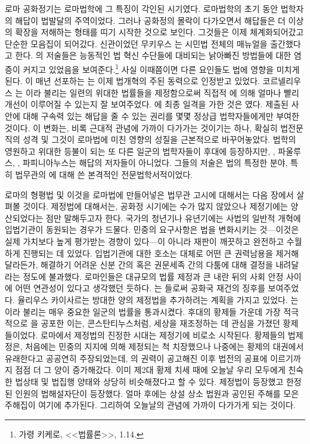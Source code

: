로마 공화정기는 로마법학에 그 특징이 각인된 시기였다.
로마법학의 초기 동안 법학자의 해답이 법발달의 주역이었다.
그러나 공화정의 몰락이 다가오면서 해답들은 더 이상의 확장을 저해하는
형태를 띠기 시작한 것으로 보인다.
그것들은 이제 체계화되어갔고 단순한 모음집이 되어갔다.
신관이었던
무키우스 는
시민법 전체의 매뉴얼을 출간했다고 한다.
의 저술들은
능동적인 법 혁신 수단들에 대비되는 낡아빠진 방법들에 대한 염증이
커지고 있었음을 보여준다.\footnote{%
  가령 키케로, <<법률론>>, 1.14. }
사실 이때쯤이면 다른 요인들도 법에 영향을 미치게 된다.
이 매년 선포하는 는
이제 법개혁의 주된 동력으로 인정받고 있었다.
코르넬리우스 는
이라 불리는 일련의 위대한 법률들을
제정함으로써 직접적 에 의해 얼마나 빨리 개선이 이루어질 수 있는지
잘 보여주었다.
에 최종 일격을 가한 것은 였다.
제출된 사안에 대해 구속력 있는 해답을 줄 수 있는 권리를
몇몇 정상급 법학자들에게만 부여한 것이다.
이 변화는, 비록 근대적 관념에 가까이 다가가는 것이기는 하나,
확실히 법전문직의 성격 및 그것이 로마법에 미친 영향의 성질을
근본적으로 바꾸어놓았다.
법학의 영원하고 위대한 등불이 되는
또 다른 일군의 법학자들이 후대에 등장하지만,
, 파울루스, , 파피니아누스는 해답의 저자들이 아니었다.
그들의 저술은 법의 특정한 분야, 특히 법무관의 에 대해 쓴
본격적인 전문법학서적이었다.

로마의 형평법 및 이것을 로마법에 만들어넣은 법무관 고시에 대해서는
다음 장에서 살펴볼 것이다.
제정법에 대해서는, 공화정 시기에는 수가 많지 않았으나
제정기에는 양산되었다는 점만 말해두고자 한다.
국가의 청년기나 유년기에는 사법의 일반적 개혁에
입법기관이 동원되는 경우가 드물다.
민중의 요구사항은 법을 변화시키는
것---이것은 실제 가치보다 높게 평가받는 경향이 있다---이 아니라
재판이 깨끗하고 완전하고 수월하게 진행되는 데 있었다.
입법기관에 대한 호소는 대체로 어떤 큰 권력남용을 제거해달라든가,
해결하기 어려운 신분 간의 혹은 권문세족 간의 다툼에 대해
결정을 내려달라는 정도에 불과했다.
로마인들은 대규모의 법률 제정과
큰 내란 뒤의 사회 안정 사이에
어떤 연관성이 있다고 생각했던 듯하다.
는 들로써 공화국 재건의 징후를 보여주었다.
율리우스 카이사르는 방대한 양의 제정법을 추가하려는 계획을 가지고 있었다.
는 이라 불리는
매우 중요한 일군의 법률을 통과시켰다.
후대의 황제들 가운데 가장 적극적으로 을 공포한 이는,
콘스탄티누스처럼, 세상을 재조정하는 데 관심을 가졌던 황제들이었다.
로마에서 제정법의 진정한 시대는 제정기에 비로소 시작된다.
황제들의 법제정은,
처음에는 민중의 지지에 의해 제정되는 척 치장했으나
나중에는 황제의 대권에서 유래한다고 공공연히 주장되었는데,
의 권력이 공고해진 이후  법전의 공표에 이르기까지
점점 더 그 양이 증가해갔다.
이미 제2대 황제 치세 때에 오늘날 우리 모두에게 친숙한 법상태 및
법집행 양태와 상당히 비슷해졌다고 할 수 있다.
제정법이 등장했고 한정된 인원의 법해설자단이 등장했다.
얼마 후에는 상설 상소 법원과 공인된 주해를 모은 주해집이 여기에 추가된다.
그리하여 오늘날의 관념에 가까이 다가가게 되는 것이다.

